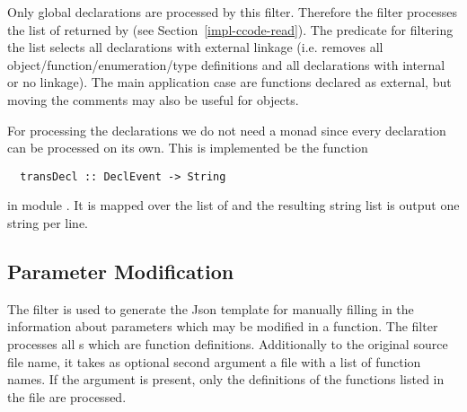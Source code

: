 Only global declarations are processed by this filter. Therefore the filter processes the list of 
returned by  (see Section~\ref{impl-ccode-read}). The predicate for filtering the list
selects all declarations with external linkage (i.e. removes all object/function/enumeration/type definitions and 
all declarations with internal or no linkage). 
The main application case are functions declared as external, but moving the comments may also be useful for 
objects.

For processing the declarations we do not need a monad since every declaration can be processed on its own. This is implemented
be the function
\begin{verbatim}
  transDecl :: DeclEvent -> String
\end{verbatim}
in module . It is mapped over the list of  and the resulting string list
is output one string per line.

\subsection{Parameter Modification}
\label{impl-comps-parmod}

The filter  is used to generate the Json template for manually filling in the information 
about parameters which may be modified in a function. The filter processes all s which are function
definitions. Additionally to the original source file name, it takes as optional second argument a file with a list 
of function names. If the argument is present, only the definitions of the functions listed in the file are processed.



